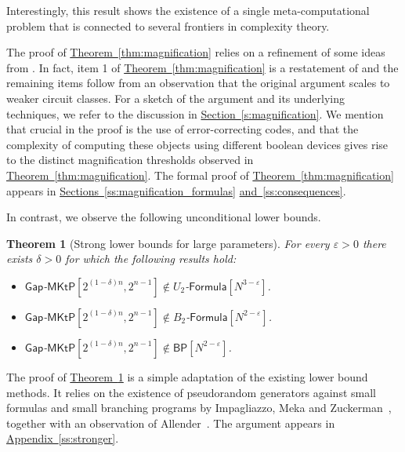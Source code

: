 \documentclass[11pt]{article}
\numberwithin{equation}{section}
\newtheorem{theorem}{Theorem}[section]
\theoremstyle{definition}
\theoremstyle{plain}
\newcommand{\expref}[2]{\hyperref[#2]{#1~\ref{#2}}}
\newcommand{\gapmktp}{\mathsf{Gap}$-$\mathsf{MKtP}}
\begin{document}
\vspace{0.2cm}

Interestingly, this result shows the existence of a single meta-computational problem that is connected to several frontiers in complexity theory.

The proof of \expref{Theorem}{thm:magnification} relies on a refinement of some ideas from \cite[Section 3.2]{OS18}. In fact, item 1 of \expref{Theorem}{thm:magnification} is a restatement of \cite[Theorem 3]{OS18} and the remaining items follow from an observation that the original argument scales to weaker circuit classes. For a sketch of the argument and its underlying techniques, we refer to the discussion in \expref{Section}{s:magnification}. We mention that crucial in the proof is the use of error-correcting codes, and that the complexity of computing these objects using different boolean devices gives rise to the distinct magnification thresholds observed in \expref{Theorem}{thm:magnification}. The formal proof of \expref{Theorem}{thm:magnification} appears in \expref{Sections}{ss:magnification_formulas} \expref{and}{ss:consequences}.

In contrast, we observe the following unconditional lower bounds.

\begin{theorem}[Strong lower bounds for large parameters] \label{thm:stronger_lower_bounds} For every $\varepsilon > 0$ there exists $\delta > 0$ for which the following results hold:  
\vspace{0.2cm}
\begin{itemize}
\item[\emph{1.}] $\gapmktp[2^{(1 - \delta)n}, 2^{n-1}] \notin U_2$-$\mathsf{Formula}[N^{3 - \varepsilon}]$.
\item[\emph{2.}] $\gapmktp[2^{(1 - \delta)n}, 2^{n-1}] \notin B_2$-$\mathsf{Formula}[N^{2 - \varepsilon}]$.
\item[\emph{3.}] $\gapmktp[2^{(1 - \delta)n}, 2^{n-1}] \notin \mathsf{BP}[N^{2 - \varepsilon}]$.
\end{itemize}
\end{theorem}

\vspace{0.2cm}

The proof of \expref{Theorem}{thm:stronger_lower_bounds} is a simple adaptation of the existing lower bound methods. It relies on the existence of pseudorandom generators against small formulas and small branching programs by Impagliazzo, Meka and Zuckerman~\cite{DBLP:conf/focs/ImpagliazzoMZ12}, together with an observation of Allender~\cite{Allender01}. The argument appears in \expref{Appendix}{ss:stronger}.
\end{document}
